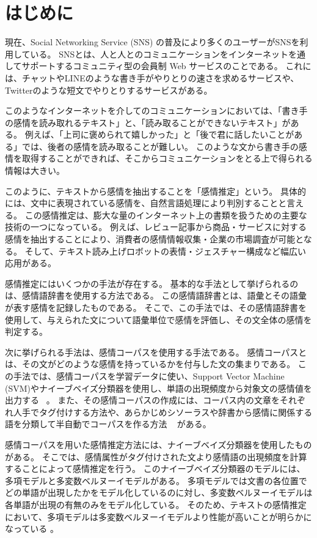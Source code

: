 \documentclass[11pt,a4j]{jsarticle}
\begin{document}
 \pagestyle{plain}
 \setcounter{page}{1}
 
 
\section{はじめに}\label{sec:begin}
 現在、Social Networking Service (SNS) の普及により多くのユーザーがSNSを利用している。
SNSとは、人と人とのコミュニケーションをインターネットを通してサポートするコミュニティ型の会員制 Web サービスのことである。
これには、チャットやLINE\raisebox{.5zw}{\scalebox{.5}{\textregistered}}のような書き手がやりとりの速さを求めるサービスや、Twitter\raisebox{.5zw}{\scalebox{.5}{\textregistered}}のような短文でやりとりするサービスがある。

このようなインターネットを介してのコミュニケーションにおいては、「書き手の感情を読み取れるテキスト」と、「読み取ることができないテキスト」がある。
例えば、「上司に褒められて嬉しかった」と「後で君に話したいことがある」では、後者の感情を読み取ることが難しい。
このような文から書き手の感情を取得することができれば、そこからコミュニケーションをとる上で得られる情報は大きい。

このように、テキストから感情を抽出することを「感情推定」という。
具体的には、文中に表現されている感情を、自然言語処理により判別することと言える。
この感情推定は、膨大な量のインターネット上の書類を扱うための主要な技術の一つになっている。
例えば、レビュー記事から商品・サービスに対する感情を抽出することにより、消費者の感情情報収集・企業の市場調査が可能となる。
そして、テキスト読み上げロボットの表情・ジェスチャー構成など幅広い応用がある。

感情推定にはいくつかの手法が存在する。
基本的な手法として挙げられるのは、感情語辞書を使用する方法である。
この感情語辞書とは、語彙とその語彙が表す感情を記録したものである。
そこで、この手法では、その感情語辞書を使用して、与えられた文について語彙単位で感情を評価し、その文全体の感情を判定する。

次に挙げられる手法は、感情コーパスを使用する手法である。
感情コーパスとは、その文がどのような感情を持っているかを付与した文の集まりである。
この手法では、感情コーパスを学習データに使い、Support Vector Machine (SVM)やナイーブベイズ分類器を使用し、単語の出現頻度から対象文の感情値を出力する ~。
また、その感情コーパスの作成には、コーパス内の文章をそれぞれ人手でタグ付けする方法や、あらかじめシソーラスや辞書から感情に関係する語を分類して半自動でコーパスを作る方法 ~ がある。

感情コーパスを用いた感情推定方法には、ナイーブベイズ分類器を使用したものがある。
そこでは、感情属性がタグ付けされた文より感情語の出現頻度を計算することによって感情推定を行う。
このナイーブベイズ分類器のモデルには、多項モデルと多変数ベルヌーイモデルがある。
多項モデルでは文書の各位置でどの単語が出現したかをモデル化しているのに対し、多変数ベルヌーイモデルは各単語が出現の有無のみをモデル化している。
そのため、テキストの感情推定において、多項モデルは多変数ベルヌーイモデルより性能が高いことが明らかになっている 。
\end{document}
